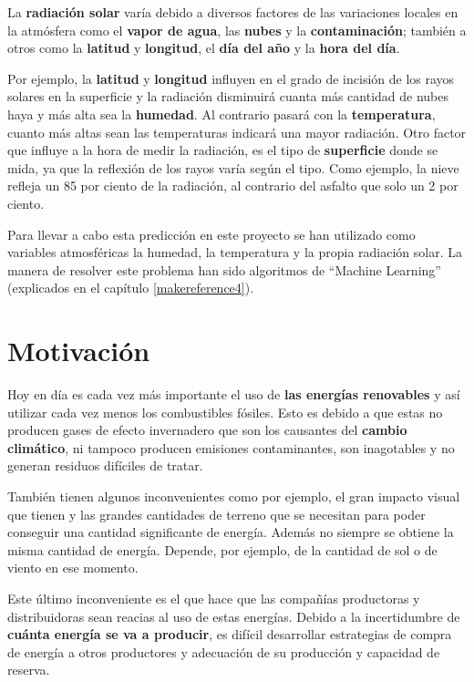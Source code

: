 La \textbf{radiación solar} varía debido a diversos factores de las variaciones locales en la atmósfera como el \textbf{vapor de agua}, las \textbf{nubes} y la \textbf{contaminación}; también a otros como la \textbf{latitud} y \textbf{longitud}, el \textbf{día del año} y la \textbf{hora del día}.

Por ejemplo, la \textbf{latitud} y \textbf{longitud} influyen en el grado de incisión de los rayos solares en la superficie y la radiación disminuirá cuanta más cantidad de nubes haya y más alta sea la \textbf{humedad}. Al contrario pasará con la \textbf{temperatura}, cuanto más altas sean las temperaturas indicará una mayor radiación. Otro factor que influye a la hora de medir la radiación, es el tipo de \textbf{superficie} donde se mida, ya que la reflexión de los rayos varía según el tipo. Como ejemplo, la nieve refleja un 85 por ciento de la radiación, al contrario del asfalto que solo un 2 por ciento.

Para llevar a cabo esta predicción en este proyecto se han utilizado como variables atmosféricas la humedad, la temperatura y la propia radiación solar. La manera de resolver este problema han sido algoritmos de ``Machine Learning'' (explicados en el capítulo \ref{makereference4}).

\section{Motivación}
\label{makereference1.1}

Hoy en día es cada vez más importante el uso de \textbf{las energías renovables} y así utilizar cada vez menos los combustibles fósiles. Esto es debido a que estas no producen gases de efecto invernadero que son los causantes del \textbf{cambio climático}, ni tampoco producen emisiones contaminantes, son inagotables y no generan residuos difíciles de tratar.

También tienen algunos inconvenientes como por ejemplo, el gran impacto visual que tienen y las grandes cantidades de terreno que se necesitan para poder conseguir una cantidad significante de energía. Además no siempre se obtiene la misma cantidad de energía. Depende, por ejemplo, de la cantidad de sol o de viento en ese momento.

Este último inconveniente es el que hace que las compañías productoras y distribuidoras sean reacias al uso de estas energías. Debido a la incertidumbre de \textbf{cuánta energía se va a producir}, es difícil desarrollar estrategias de compra de energía a otros productores y adecuación de su producción y capacidad de reserva.

